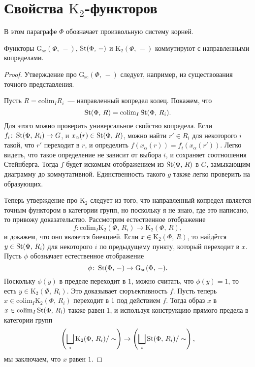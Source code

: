 \documentclass[12pt,a4paper]{article}
\begin{document}
\section{Свойства $\mathrm K_2$-функторов}

В этом параграфе $\Phi$ обозначает произвольную систему корней.

\begin{lemma}
\label{k2cdc}
Функторы  $\mathrm G_{\mathrm{sc}}(\Phi,\,-)$, $\mathop{\mathrm{St}}\nolimits(\Phi,\,-)$ и $\mathrm K_2(\Phi,\,-)$ коммутируют с направленными копределами. 
\end{lemma}
\begin{proof}
Утверждение про $\mathrm G_{\mathrm{sc}}(\Phi,\,-)$ следует, например, из существования точного представления. 

Пусть $R=\mathrm{colim}_I R_i$~--- направленный копредел колец. Покажем, что 
$$
\mathop{\mathrm{St}}\nolimits(\Phi,\,R)=\mathrm{colim}_I\mathop{\mathrm{St}}\nolimits(\Phi,\,R_i).
$$
Для этого можно проверить универсальное свойство копредела. Если $f_i\colon\mathop{\mathrm{St}}\nolimits(\Phi,\,R_i)\rightarrow G$, и $x_\alpha(r)\in\mathop{\mathrm{St}}\nolimits(\Phi,\,R)$, можно найти $r'\in R_i$ для некоторого $i$ такой, что $r'$ переходит в $r$, и определить $f(x_\alpha(r))=f_i(x_\alpha(r'))$. Легко видеть, что такое определение не зависит от выбора $i$, и сохраняет соотношения Стейнберга. Тогда $f$ будет искомым отображением из $\mathop{\mathrm{St}}\nolimits(\Phi,\,R)$ в $G$, замыкающим диаграмму до коммутативной. Единственность такого $g$ также легко проверить на образующих.

Теперь утверждение про $\mathrm K_2$ следует из того, что направленный копредел является точным функтором в категории групп, но поскольку я не знаю, где это написано, то привожу доказательство. Рассмотрим естественное отображение
$$
f\colon\mathrm{colim}_I\mathrm K_2(\Phi,\,R_i)\rightarrow\mathrm K_2(\Phi,\,R),
$$
и докажем, что оно является биекцией. Если $x\in\mathrm K_2(\Phi,\,R)$, то найдётся $y\in\mathop{\mathrm{St}}\nolimits(\Phi,\,R_i)$ для некоторого $i$ по предыдущему пункту, который переходит в $x$. Пусть $\phi$ обозначает естественное отображение
$$
\phi\colon\mathop{\mathrm{St}}\nolimits(\Phi,\,-)\rightarrow\mathrm G_{\mathrm{sc}}(\Phi,\,-).
$$
Поскольку $\phi(y)$ в пределе переходит в $1$, можно считать, что $\phi(y)=1$, то есть $y\in\mathrm K_2(\Phi,\,R_i)$. Это доказывает сюръективность $f$. Пусть теперь $x\in\mathrm{colim}_I\mathrm K_2(\Phi,\,R_i)$ переходит в $1$ под действием $f$. Тогда образ $x$ в $x\in\mathrm{colim}_I\mathop{\mathrm{St}}\nolimits(\Phi,\,R_i)$ также равен $1$, и используя конструкцию прямого предела в категории групп
$$
\left(\bigsqcup_i\mathrm K_2(\Phi,\,R_i)/\sim\right)\rightarrow\left(\bigsqcup_i\mathop{\mathrm{St}}\nolimits(\Phi,\,R_i)/\sim\right),
$$
мы заключаем, что $x$ равен $1$.
\end{proof}
\end{document}
